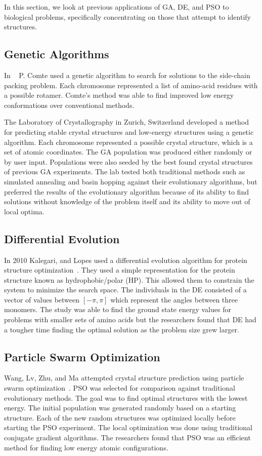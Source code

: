 In this section, we look at previous applications of GA, DE, and PSO to biological problems, specifically concentrating on those that attempt to identify structures.

\subsection{Genetic Algorithms}

In ~\cite{comte2010bio} P. Comte used a genetic algorithm to search for solutions to the side-chain packing problem. Each chromosome represented a list of amino-acid residues with a possible rotamer. Comte's method was able to find improved low energy conformations over conventional methods.

The Laboratory of Crystallography in Zurich, Switzerland developed a method~\cite{oganov2006crystal} for predicting stable crystal structures and low-energy structures using a genetic algorithm. Each chromosome represented a possible crystal structure, which is a set of atomic coordinates. The GA population was produced either randomly or by user input. Populations were also seeded by the best found crystal structures of previous GA experiments. The lab tested both traditional methods such as simulated annealing and basin hopping against their evolutionary algorithms, but preferred the results of the evolutionary algorithm because of its ability to find solutions without knowledge of the problem itself and its ability to move out of local optima.

\subsection{Differential Evolution}

In 2010 Kalegari, and Lopes used a differential evolution algorithm for protein structure optimization~\cite{kalegari2010differential}. They used a simple representation for the protein structure known as hydrophobic/polar (HP). This allowed them to constrain the system to minimize the search space. The individuals in the DE consisted of a vector of values between $[-\pi, \pi]$ which represent the angles between three monomers. The study was able to find the ground state energy values for problems with smaller sets of amino acids but the researchers found that DE had a tougher time finding the optimal solution as the problem size grew larger.

\subsection{Particle Swarm Optimization}

Wang, Lv, Zhu, and Ma attempted crystal structure prediction using particle swarm optimization~\cite{wang2010crystal}. PSO was selected for comparison against traditional evolutionary methods. The goal was to find optimal structures with the lowest energy. The initial population was generated randomly based on a starting structure. Each of the new random structures was optimized locally before starting the PSO experiment. The local optimization was done using traditional conjugate gradient algorithms. The researchers found that PSO was an efficient method for finding low energy atomic configurations.